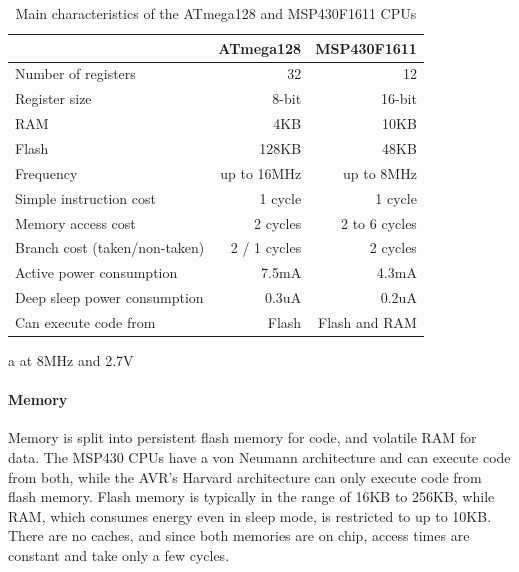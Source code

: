 \begin{table}
\caption{Main characteristics of the ATmega128 and MSP430F1611 CPUs}
\label{tbl-ATmega128-msp430f1611}
    \begin{threeparttable}
    \begin{tabular}{lrr}
    \toprule
                                           & ATmega128 \cite{Atmel:ATmega128Datasheet, Atmel:AVRInstructionSetManual}   & MSP430F1611 \cite{TexasInstrumentsIncorporated:MSP430F1611Datasheet, TexasInstrumentsIncorporated:MSP430x1xxUsersGuide} \\
    \midrule
    \midrule
    Number of registers                    & 32           & 12            \\
    Register size                          & 8-bit        & 16-bit        \\
    RAM                                    & 4KB          & 10KB          \\
    Flash                                  & 128KB        & 48KB          \\
    Frequency                              & up to 16MHz  & up to 8MHz    \\
    Simple instruction cost                & 1 cycle      & 1 cycle       \\
    Memory access cost                     & 2 cycles     & 2 to 6 cycles \\
    Branch cost (taken/non-taken)          & 2 / 1 cycles & 2 cycles      \\
    Active power consumption\tnote{a}      & 7.5mA        & 4.3mA         \\ %
    Deep sleep power consumption           & 0.3uA        & 0.2uA         \\
    Can execute code from                  & Flash        & Flash and RAM \\
    \bottomrule
    \end{tabular}
    \begin{tablenotes}
        \item[a] at 8MHz and 2.7V
    \end{tablenotes}
    \end{threeparttable}
\end{table}

\paragraph{Memory}
Memory is split into persistent flash memory for code, and volatile RAM for data. The MSP430 CPUs have a von Neumann architecture and can execute code from both, while the AVR's Harvard architecture can only execute code from flash memory. Flash memory is typically in the range of 16KB to 256KB, while RAM, which consumes energy even in sleep mode, is restricted to up to 10KB. There are no caches, and since both memories are on chip, access times are constant and take only a few cycles.

